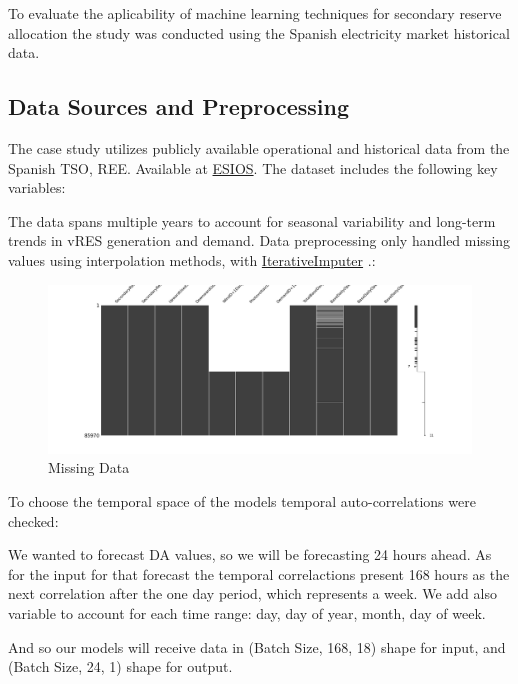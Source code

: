 To evaluate the aplicability of machine learning techniques for secondary reserve allocation the study was conducted using the Spanish electricity market historical data.

\subsection{Data Sources and Preprocessing}

The case study utilizes publicly available operational and historical data from the Spanish \gls{TSO}, \gls{REE}. Available at \href{https://www.esios.ree.es/es}{\gls{ESIOS}}. The dataset includes the following key variables:




The data spans multiple years to account for seasonal variability and long-term trends in vRES generation and demand. Data preprocessing only handled missing values using interpolation methods, with \href{https://scikit-learn.org/stable/modules/generated/sklearn.impute.IterativeImputer.html}{IterativeImputer} \cite{vanBuuren2011}\cite{Buck1960}.:

\begin{figure}[H]
    \centering
    \includegraphics[width=\textwidth]{plots/missing_data.png}
    \caption{Missing Data}
    \label{fig:misisng_data}
  \end{figure}


To choose the temporal space of the models temporal auto-correlations were checked:




We wanted to forecast \gls{DA} values, so we will be forecasting 24 hours ahead. As for the input for that forecast the temporal correlactions present 168 hours as the next correlation after the one day period, which represents a week.
We add also variable to account for each time range: day, day of year, month, day of week.\par
And so our models will receive data in (Batch Size, 168, 18) shape for input, and (Batch Size, 24, 1) shape for output.



